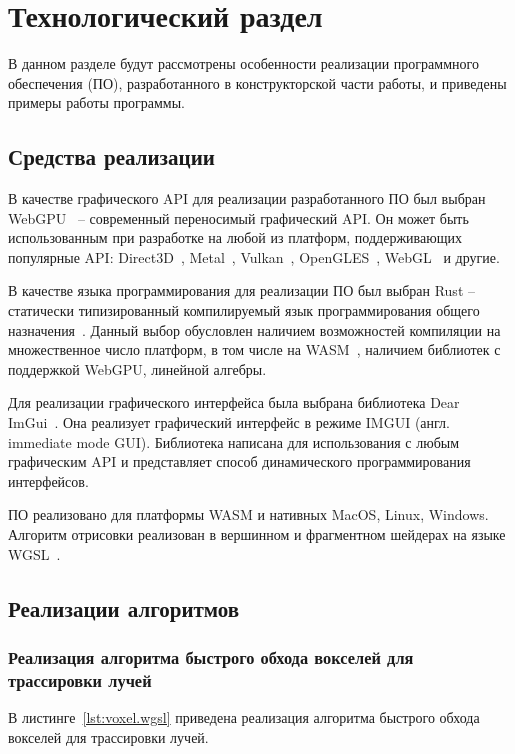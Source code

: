 \chapter{Технологический раздел}

В данном разделе будут рассмотрены особенности реализации программного обеспечения (ПО),
разработанного в конструкторской части работы, и приведены примеры работы программы.

\section{Средства реализации}

В качестве графического API для реализации разработанного ПО 
был выбран WebGPU~\cite{WebGPU} -- современный переносимый графический
API.
Он может быть использованным при разработке на любой из платформ, 
поддерживающих популярные API: Direct3D~\cite{DirectX12}, 
Metal~\cite{Metal}, Vulkan~\cite{Vulkan}, OpenGLES~\cite{OpenGLES}, WebGL~\cite{WebGL} и другие.

В качестве языка программирования для реализации ПО был выбран Rust -- 
статически типизированный компилируемый язык программирования общего назначения~\cite{Rust}.
Данный выбор обусловлен наличием возможностей 
компиляции на множественное число платформ, в том числе на WASM~\cite{WASM}, наличием
библиотек с поддержкой WebGPU, линейной алгебры.

Для реализации графического интерфейса была выбрана библиотека Dear ImGui~\cite{ImGui}.
Она реализует графический интерфейс в режиме IMGUI (англ. immediate mode GUI). Библиотека написана 
для использования с любым графическим API и представляет способ динамического 
программирования интерфейсов.

ПО реализовано для платформы WASM и нативных MacOS, Linux, Windows. 
Алгоритм отрисовки реализован в вершинном и фрагментном шейдерах на языке WGSL~\cite{WebGPUSL}.

\section{Реализации алгоритмов}

\subsection{Реализация алгоритма быстрого обхода вокселей для трассировки лучей}

В листинге~\ref{lst:voxel.wgsl} приведена реализация алгоритма быстрого 
обхода вокселей для трассировки лучей.


